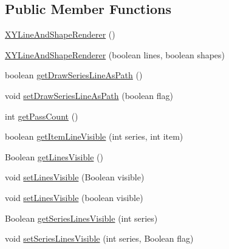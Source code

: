 \subsection*{Public Member Functions}
\begin{DoxyCompactItemize}
\item 
\mbox{\hyperlink{classorg_1_1jfree_1_1chart_1_1renderer_1_1xy_1_1_x_y_line_and_shape_renderer_af843798c4bd0e8e24e967e19a90eedfc}{X\+Y\+Line\+And\+Shape\+Renderer}} ()
\item 
\mbox{\hyperlink{classorg_1_1jfree_1_1chart_1_1renderer_1_1xy_1_1_x_y_line_and_shape_renderer_a8559649ee541db5495424873734a7999}{X\+Y\+Line\+And\+Shape\+Renderer}} (boolean lines, boolean shapes)
\item 
boolean \mbox{\hyperlink{classorg_1_1jfree_1_1chart_1_1renderer_1_1xy_1_1_x_y_line_and_shape_renderer_a5303dc0f0def660a31760dd5c09b80b9}{get\+Draw\+Series\+Line\+As\+Path}} ()
\item 
void \mbox{\hyperlink{classorg_1_1jfree_1_1chart_1_1renderer_1_1xy_1_1_x_y_line_and_shape_renderer_a55209b5160cfc29ae9e3688812655389}{set\+Draw\+Series\+Line\+As\+Path}} (boolean flag)
\item 
int \mbox{\hyperlink{classorg_1_1jfree_1_1chart_1_1renderer_1_1xy_1_1_x_y_line_and_shape_renderer_addd2389f670fbb87080789c616dfbb91}{get\+Pass\+Count}} ()
\item 
boolean \mbox{\hyperlink{classorg_1_1jfree_1_1chart_1_1renderer_1_1xy_1_1_x_y_line_and_shape_renderer_a7c2ceea16ba4b69cded2fd053754befb}{get\+Item\+Line\+Visible}} (int series, int item)
\item 
Boolean \mbox{\hyperlink{classorg_1_1jfree_1_1chart_1_1renderer_1_1xy_1_1_x_y_line_and_shape_renderer_af0fece769cf57e414721478f2b43411c}{get\+Lines\+Visible}} ()
\item 
void \mbox{\hyperlink{classorg_1_1jfree_1_1chart_1_1renderer_1_1xy_1_1_x_y_line_and_shape_renderer_a806284dac4ab82c45330b32f2ce96961}{set\+Lines\+Visible}} (Boolean visible)
\item 
void \mbox{\hyperlink{classorg_1_1jfree_1_1chart_1_1renderer_1_1xy_1_1_x_y_line_and_shape_renderer_a6ec940bf380513700d9bfe332f4f357b}{set\+Lines\+Visible}} (boolean visible)
\item 
Boolean \mbox{\hyperlink{classorg_1_1jfree_1_1chart_1_1renderer_1_1xy_1_1_x_y_line_and_shape_renderer_a12d61d772cadf4553c06817d8dab579a}{get\+Series\+Lines\+Visible}} (int series)
\item 
void \mbox{\hyperlink{classorg_1_1jfree_1_1chart_1_1renderer_1_1xy_1_1_x_y_line_and_shape_renderer_a3e09e10111a246bb357322764827c6bb}{set\+Series\+Lines\+Visible}} (int series, Boolean flag)

\end{DoxyCompactItemize}
